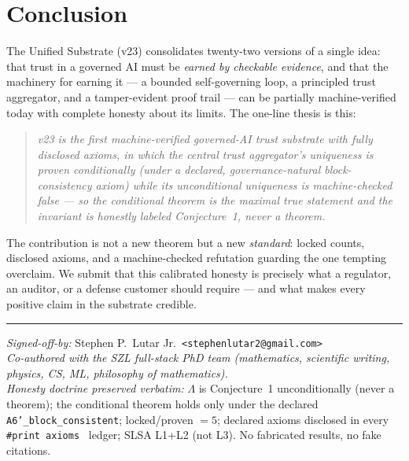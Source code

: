 \documentclass[11pt]{article}
\theoremstyle{plain}
\theoremstyle{definition}
\theoremstyle{remark}
\newcommand{\La}{\Lambda}
\newcommand{\printax}[1]{\texttt{\#print axioms}~\texttt{#1}}
\begin{document}
\section{Conclusion}
\label{sec:conclusion}

The Unified Substrate (v23) consolidates twenty-two versions of a single idea: that
trust in a governed AI must be \emph{earned by checkable evidence}, and that the
machinery for earning it --- a bounded self-governing loop, a principled trust
aggregator, and a tamper-evident proof trail --- can be partially machine-verified
today with complete honesty about its limits. The one-line thesis is this:
\begin{quote}\itshape
v23 is the first machine-verified governed-AI trust substrate with fully disclosed
axioms, in which the central trust aggregator's uniqueness is proven \emph{conditionally}
(under a declared, governance-natural block-consistency axiom) while its \emph{unconditional}
uniqueness is machine-checked \emph{false} --- so the conditional theorem is the maximal
true statement and the invariant is honestly labeled Conjecture~1, never a theorem.
\end{quote}
The contribution is not a new theorem but a new \emph{standard}: locked counts,
disclosed axioms, and a machine-checked refutation guarding the one tempting overclaim.
We submit that this calibrated honesty is precisely what a regulator, an auditor, or a
defense customer should require --- and what makes every positive claim in the
substrate credible.




\vspace{1.5em}
\hrule
\vspace{0.6em}
\noindent\small
\textit{Signed-off-by:} Stephen P.\ Lutar Jr.\ \texttt{<stephenlutar2@gmail.com>} \\
\textit{Co-authored with the SZL full-stack PhD team (mathematics, scientific writing,
physics, CS, ML, philosophy of mathematics).} \\
\textit{Honesty doctrine preserved verbatim:} $\La$ is Conjecture~1 unconditionally
(never a theorem); the conditional theorem holds only under the declared
\texttt{A6'\_block\_consistent}; locked/proven $=5$; declared axioms disclosed in every
\printax{} ledger; SLSA L1+L2 (not L3). No fabricated results, no fake citations.
\normalsize
\end{document}
